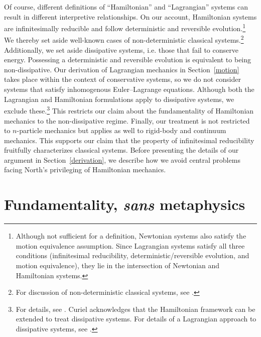 \documentclass[12pt, english, twoside]{article} %
\begin{document}
Of course, different definitions of ``Hamiltonian'' and ``Lagrangian'' systems can result in different interpretive relationships. On our account, Hamiltonian systems are infinitesimally reducible and follow deterministic and reversible evolution.\footnote{Although not sufficient for a definition, Newtonian systems also satisfy the motion equivalence assumption. Since Lagrangian systems satisfy all three conditions (infinitesimal reducibility, deterministic/reversible evolution, and motion equivalence), they lie in the intersection of Newtonian and Hamiltonian systems.} We thereby set aside well-known cases of non-deterministic classical systems.\footnote{For discussion of non-deterministic classical systems, see \textcites*[3-4]{Baez}{Earman}{Norton}.} Additionally, we set aside dissipative systems, i.e. those that fail to conserve energy. Possessing a deterministic and reversible evolution is equivalent to being non-dissipative. Our derivation of Lagrangian mechanics in Section~\ref{motion} takes place within the context of conservative systems, so we do not consider systems that satisfy inhomogenous Euler--Lagrange equations. Although both the Lagrangian and Hamiltonian formulations apply to dissipative systems, we exclude these.\footnote{For details, see \textcites[\S 10.4]{Cline}. Curiel \parencites*[311]{Curiel} acknowledges that the Hamiltonian framework can be extended to treat dissipative systems. For details of a Lagrangian approach to dissipative systems, see \textcites[]{Smith}.} This restricts our claim about the fundamentality of Hamiltonian mechanics to the non-dissipative regime. Finally, our treatment is not restricted to $n$-particle mechanics but applies as well to rigid-body and continuum mechanics. This supports our claim that the property of infinitesimal reducibility fruitfully characterizes classical systems. Before presenting the details of our argument in Section~\ref{derivation}, we describe how we avoid central problems facing North's privileging of Hamiltonian mechanics. 


\section{Fundamentality, \textit{sans} metaphysics}
\label{fundamentality}
\end{document}
